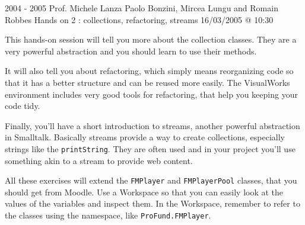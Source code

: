 \documentclass[a4paper,10pt]{scrartcl}
\begin{document}

	{2004 - 2005}
	{Prof. Michele Lanza}
	{Paolo Bonzini, Mircea Lungu and Romain Robbes}
	{Hands on 2 : collections, refactoring, streams}
	{16/03/2005 @ 10:30}


This hands-on session will tell you more about the collection classes.
They are a very powerful abstraction and you should learn to use their
methods.

It will also tell you about refactoring, which simply means reorganizing
code so that it has a better structure and can be reused more easily.
The VisualWorks environment includes very good tools for refactoring,
that help you keeping your code tidy.

Finally, you'll have a short introduction to streams, another powerful
abstraction in Smalltalk.  Basically streams provide a way to create
collections, especially strings like the \verb!printString!.  They are often
used and in your project you'll use something akin to a stream to
provide web content.

All these exercises will extend the \verb!FMPlayer! and \verb!FMPlayerPool!
classes, that you should get from Moodle.  Use
a Workspace so that you can easily look at the values of the variables
and inspect them.  In the Workspace, remember to refer to the classes
using the namespace, like \verb!ProFund.FMPlayer!.
\end{document}

